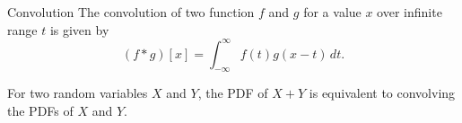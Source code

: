 \begin{fact}{Convolution}{}
  The convolution of two function $f$ and $g$ for a value $x$ over infinite range $t$ is given by
  \begin{equation*}
    (f*g)[x] = \int_{-\infty}^{\infty}f(t)g(x-t)\,dt.
  \end{equation*}
\end{fact}

For two random variables $X$ and $Y$, the PDF of $X+Y$ is equivalent to convolving the PDFs of $X$ and $Y$.
